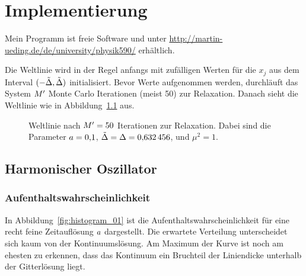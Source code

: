 
\chapter{Implementierung}

Mein Programm ist freie Software und unter
\url{http://martin-ueding.de/de/university/physik590/} erhältlich.

Die Weltlinie wird in der Regel anfangs mit zufälligen Werten für die $x_j$ aus
dem Interval $(-\tilde \Delta, \tilde \Delta)$ initialisiert. Bevor
Werte aufgenommen werden, durchläuft das System $M'$ Monte Carlo
Iterationen (meist \num{50}) zur Relaxation. Danach sieht die Weltlinie wie in
Abbildung~\ref{fig:relaxiert} aus.

\begin{figure}[htbp]
    \centering
    \caption{%
        Weltlinie nach $M' = \num{50}$ Iterationen zur Relaxation.
        Dabei sind die Parameter $a = \num{0.1}$, $\tilde \Delta
        = \Delta = \num{0.632456}$, und $\mu^2 = \num{1}$.
    }
    \label{fig:relaxiert}
\end{figure}


\section{Harmonischer Oszillator}

\subsection{Aufenthaltswahrscheinlichkeit}

In Abbildung~\ref{fig:histogram_01} ist die Aufenthaltswahrscheinlichkeit für
eine recht feine Zeitauflösung $a$ dargestellt. Die erwartete
Verteilung unterscheidet sich kaum von der Kontinuumslösung. Am Maximum der
Kurve ist noch am ehesten zu erkennen, dass das Kontinuum ein Bruchteil der
Liniendicke unterhalb der Gitterlösung liegt.

